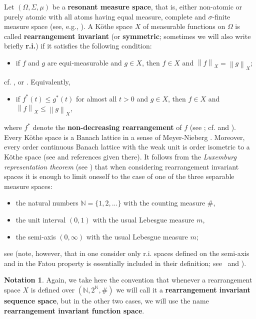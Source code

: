 \documentclass[11pt]{amsart}
\theoremstyle{definition}
\theoremstyle{definition}
\theoremstyle{definition}
\theoremstyle{definition}
\theoremstyle{definition}
\theoremstyle{definition}
\theoremstyle{definition}
\theoremstyle{definition}
\numberwithin{equation}{section}
\numberwithin{equation}{section}
\numberwithin{equation}{section}
\theoremstyle{definition}
\theoremstyle{definition}
\newtheorem{notation}[theorem]{Notation}
\theoremstyle{definition}
\theoremstyle{definition}
\theoremstyle{definition}
\theoremstyle{definition}
\newcommand{\norm}[1]{\left\lVert#1\right\rVert}
\begin{document}
Let $(\Omega, \Sigma, \mu)$ be a {\bf resonant measure space}, that is, either non-atomic or purely atomic with all atoms having equal measure,
complete and $\sigma$-finite measure space (see, e.g., \cite[Theorem~2.7, p.~51]{BS88}).
A K{\" o}the space $X$ of measurable functions on $\Omega$ is called {\bf rearrangement invariant} (or {\bf symmetric}; sometimes we will
also write briefly {\bf r.i.}) if it satisfies the following condition:
\begin{itemize}
	\item[$\bullet$] if $f$ and $g$ are equi-measurable and $g \in X$, then $f \in X$ and $\norm{f}_X = \norm{g}_X$;
\end{itemize}
cf. \cite[Definition~4.1, p.~59]{BS88}, \cite[Definition~2.a.1, pp.~117--118]{LT79} or \cite[p.~90]{KPS82}. Equivalently,
\begin{itemize}
	\item[$\bullet$] if $f^*(t) \leqslant g^*(t)$ for almost all $t > 0$ and $g \in X$, then $f \in X$ and $\norm{f}_X \leqslant \norm{g}_X$,
\end{itemize}
where $f^*$ denote the {\bf non-decreasing rearrangement} of $f$ (see \cite[p.~90]{KPS82}; cf. \cite[Definition~1.5, p.~39]{BS88} and \cite[p.~117]{LT79}).
Every K{\" o}the space is a Banach lattice in a sense of Meyer-Nieberg \cite{MN91}. Moreover, every order continuous Banach lattice with the weak
unit is order isometric to a K{\" o}the space (see \cite[Theorem~1.b.14, p.~25]{LT79} and references given there).
It follows from the {\it Luxemburg representation theorem} (see \cite[Theorem~4.10, p.~62]{BS88}) that when considering rearrangement invariant
spaces it is enough to limit oneself to the case of one of the three separable measure spaces:
\begin{itemize}
	\item[$\bullet$] the natural numbers $\mathbb{N} = \{1,2,...\}$ with the counting measure $\#$,
	\item[$\bullet$] the unit interval $(0,1) $ with the usual Lebesgue measure $m$,
	\item[$\bullet$] the semi-axis $(0,\infty)$ with the usual Lebesgue measure $m$;
\end{itemize}
see \cite[pp.~114--115]{LT79} (note, however, that in \cite{KPS82} one consider only r.i. spaces defined on the semi-axis and in \cite{BS88}
the Fatou property is essentially included in their definition; see~\cite[p.~90]{KPS82} and \cite[Definition~1.1, p.~2]{BS88}).

\begin{notation}
	Again, we take here the convention that whenever a rearrangement space $X$ is defined over $(\mathbb{N}, 2^{\mathbb{N}}, \#)$ we will call it
	a {\bf rearrangement invariant sequence space}, but in the other two cases, we will use the name {\bf rearrangement invariant function space}.
\end{notation}
\end{document}

